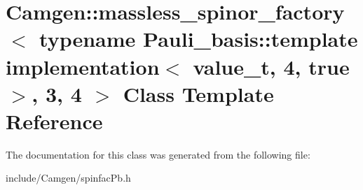 \hypertarget{a00357}{\section{Camgen\-:\-:massless\-\_\-spinor\-\_\-factory$<$ typename Pauli\-\_\-basis\-:\-:template implementation$<$ value\-\_\-t, 4, true $>$, 3, 4 $>$ Class Template Reference}
\label{a00357}
}


The documentation for this class was generated from the following file\-:\begin{DoxyCompactItemize}
\item 
include/\-Camgen/spinfac\-Pb.\-h\end{DoxyCompactItemize}
